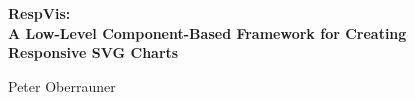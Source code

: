 %
%
% 
% 
% 




\vspace*{2cm}


\begin{center}
    \begin{spacing}{1.1}
        \Huge\sffamily\bfseries
        RespVis:\\
        A Low-Level Component-Based Framework for Creating\\
        Responsive SVG Charts
    \end{spacing}

    \vspace{3cm}


    \vspace{3cm}

    {\LARGE\sffamily
        Peter Oberrauner
    }
\end{center}








\cleardoublepage


\vspace*{-3cm}

